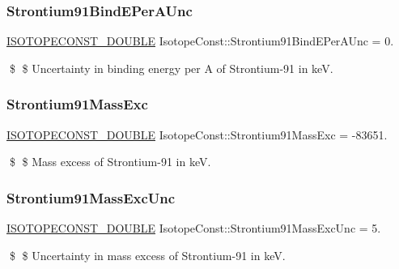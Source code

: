 \subsubsection{\texorpdfstring{Strontium91\+Bind\+E\+Per\+A\+Unc}{Strontium91BindEPerAUnc}}
{\footnotesize\ttfamily \mbox{\hyperlink{group___isotope_const-_macros_ga8f45a7272ce02c0b4c65c44636ed719a}{I\+S\+O\+T\+O\+P\+E\+C\+O\+N\+S\+T\+\_\+\+D\+O\+U\+B\+LE}} Isotope\+Const\+::\+Strontium91\+Bind\+E\+Per\+A\+Unc = 0.}

\$ \$ Uncertainty in binding energy per A of Strontium-\/91 in keV. \mbox{\label{group___isotope_const-_strontium-_sr91_ga07c49e6ad0ae4115ff9acf8577bd6b2b}} 
\subsubsection{\texorpdfstring{Strontium91\+Mass\+Exc}{Strontium91MassExc}}
{\footnotesize\ttfamily \mbox{\hyperlink{group___isotope_const-_macros_ga8f45a7272ce02c0b4c65c44636ed719a}{I\+S\+O\+T\+O\+P\+E\+C\+O\+N\+S\+T\+\_\+\+D\+O\+U\+B\+LE}} Isotope\+Const\+::\+Strontium91\+Mass\+Exc = -\/83651.}

\$ \$ Mass excess of Strontium-\/91 in keV. \mbox{\label{group___isotope_const-_strontium-_sr91_gaf6dd2af278f40c2cbaf12eb22115573f}} 
\subsubsection{\texorpdfstring{Strontium91\+Mass\+Exc\+Unc}{Strontium91MassExcUnc}}
{\footnotesize\ttfamily \mbox{\hyperlink{group___isotope_const-_macros_ga8f45a7272ce02c0b4c65c44636ed719a}{I\+S\+O\+T\+O\+P\+E\+C\+O\+N\+S\+T\+\_\+\+D\+O\+U\+B\+LE}} Isotope\+Const\+::\+Strontium91\+Mass\+Exc\+Unc = 5.}

\$ \$ Uncertainty in mass excess of Strontium-\/91 in keV. \mbox{\label{group___isotope_const-_strontium-_sr91_gae0e48b34336c1fe5d86330ff1707484a}} 
